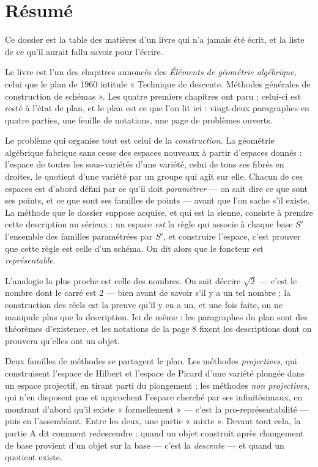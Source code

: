 \documentclass[11pt,a4paper]{article}
\begin{document}
\section*{Résumé}

\begin{resume}
Ce dossier est la table des matières d'un livre qui n'a jamais été écrit, et
la liste de ce qu'il aurait fallu savoir pour l'écrire.

Le livre est l'un des chapitres annoncés des \emph{Éléments de géométrie
algébrique}, celui que le plan de 1960 intitule « Technique de descente.
Méthodes générales de construction de schémas ». Les quatre premiers
chapitres ont paru ; celui-ci est resté à l'état de plan, et le plan est ce
que l'on lit ici : vingt-deux paragraphes en quatre parties, une feuille de
notations, une page de problèmes ouverts.

Le problème qui organise tout est celui de la \emph{construction}. La
géométrie algébrique fabrique sans cesse des espaces nouveaux à partir
d'espaces donnés : l'espace de toutes les sous-variétés d'une variété, celui
de tous ses fibrés en droites, le quotient d'une variété par un groupe qui
agit sur elle. Chacun de ces espaces est d'abord défini par ce qu'il doit
\emph{paramétrer} — on sait dire ce que sont ses points, et ce que sont ses
familles de points — avant que l'on sache s'il existe. La méthode que le
dossier suppose acquise, et qui est la sienne, consiste à prendre cette
description au sérieux : un espace \emph{est} la règle qui associe à chaque
base $S'$ l'ensemble des familles paramétrées par $S'$, et construire
l'espace, c'est prouver que cette règle est celle d'un schéma. On dit alors
que le foncteur est \emph{représentable}.

L'analogie la plus proche est celle des nombres. On sait décrire $\sqrt 2$ —
c'est le nombre dont le carré est $2$ — bien avant de savoir s'il y a un tel
nombre ; la construction des réels est la preuve qu'il y en a un, et une fois
faite, on ne manipule plus que la description. Ici de même : les paragraphes
du plan sont des théorèmes d'existence, et les notations de la page 8 fixent
les descriptions dont on prouvera qu'elles ont un objet.

Deux familles de méthodes se partagent le plan. Les méthodes
\emph{projectives}, qui construisent l'espace de Hilbert et l'espace de
Picard d'une variété plongée dans un espace projectif, en tirant parti du
plongement ; les méthodes \emph{non projectives}, qui n'en disposent pas et
approchent l'espace cherché par ses infinitésimaux, en montrant d'abord qu'il
existe « formellement » — c'est la pro-représentabilité — puis en
l'assemblant. Entre les deux, une partie « mixte ». Devant tout cela, la
partie A dit comment redescendre : quand un objet construit après changement
de base provient d'un objet sur la base — c'est la \emph{descente} — et quand
un quotient existe.


\end{resume}
\end{document}
